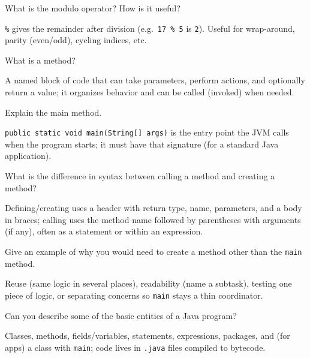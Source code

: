 \newpage

\question[4]
What is the modulo operator? How is it useful?
\begin{solutionorbox}[1.2in]
  \texttt{\%} gives the remainder after division (e.g.\ \texttt{17 \% 5} is \texttt{2}). Useful for wrap-around, parity (even/odd), cycling indices, etc.
\end{solutionorbox}


\question[4]
What is a method?
\begin{solutionorbox}[1.1in]
  A named block of code that can take parameters, perform actions, and optionally return a value; it organizes behavior and can be called (invoked) when needed.
\end{solutionorbox}

\question[4]
Explain the main method.
\begin{solutionorbox}[1.35in]
  \texttt{public static void main(String[] args)} is the entry point the JVM calls when the program starts; it must have that signature (for a standard Java application).
\end{solutionorbox}

\newpage

\question[4]
What is the difference in syntax between calling a method and creating a method?
\begin{solutionorbox}[1.25in]
  Defining/creating uses a header with return type, name, parameters, and a body in braces; calling uses the method name followed by parentheses with arguments (if any), often as a statement or within an expression.
\end{solutionorbox}

\question[4]
Give an example of why you would need to create a method other than the \texttt{main} method.
\begin{solutionorbox}[1.2in]
  Reuse (same logic in several places), readability (name a subtask), testing one piece of logic, or separating concerns so \texttt{main} stays a thin coordinator.
\end{solutionorbox}

\question[4]
Can you describe some of the basic entities of a Java program?
\begin{solutionorbox}[1.45in]
  Classes, methods, fields/variables, statements, expressions, packages, and (for apps) a class with \texttt{main}; code lives in \texttt{.java} files compiled to bytecode.
\end{solutionorbox}

\newpage


